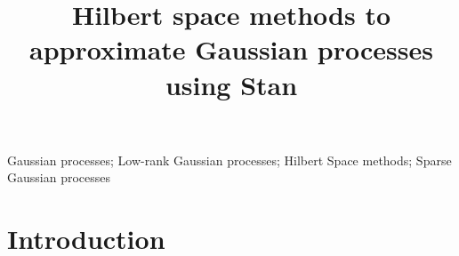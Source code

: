 \documentclass[]{interact}
\theoremstyle{plain}%
\theoremstyle{definition}
\theoremstyle{remark}
\begin{document}

\title{Hilbert space methods to approximate Gaussian processes using Stan}


\maketitle

\begin{abstract}

\end{abstract}

\begin{keywords}
Gaussian processes; Low-rank Gaussian processes; Hilbert Space methods; Sparse Gaussian processes
\end{keywords}

\tableofcontents


\newpage

\section{Introduction}\label{sec:bf_intro}
\end{document}
